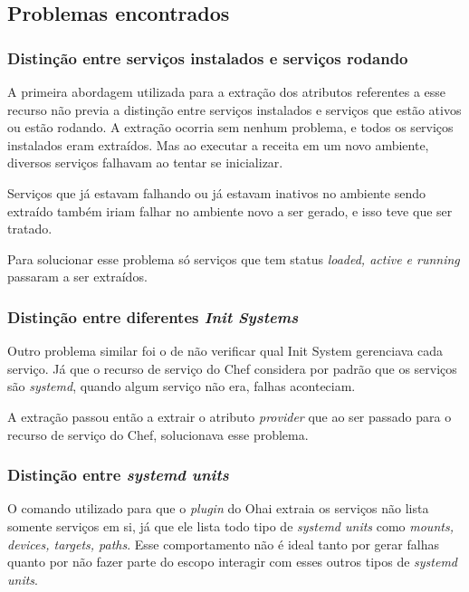 \noindent\begin{minipage}{\textwidth}
  \lstset{style=shell}
  
\end{minipage}\hfill



\subsection{Problemas encontrados}

\subsubsection{Distinção entre serviços instalados e serviços rodando}
A primeira abordagem utilizada para a extração dos atributos referentes a esse
recurso não previa a distinção entre serviços instalados e serviços que estão
ativos ou estão rodando. A extração ocorria sem nenhum problema, e todos os serviços
instalados eram extraídos. Mas ao executar a receita em um novo ambiente, diversos
serviços falhavam ao tentar se inicializar.

Serviços que já estavam falhando ou já estavam inativos no ambiente sendo extraído
também iriam falhar no ambiente novo a ser gerado, e isso teve que ser tratado.


Para solucionar esse problema só serviços que tem status \textit{loaded, active e running}
passaram a ser extraídos.\

\subsubsection{Distinção entre diferentes \textit{Init Systems}}
Outro problema similar foi o de não verificar qual Init System gerenciava cada
serviço. Já que o recurso de serviço do Chef considera por padrão que os serviços
são \textit{systemd}, quando algum serviço não era, falhas aconteciam.

A extração passou então a extrair o atributo \textit{provider} que ao ser passado
para o recurso de serviço do Chef, solucionava esse problema.

\subsubsection{Distinção entre \textit{systemd units}}
O comando utilizado para que o \textit{plugin} do Ohai extraia os serviços não
lista somente serviços em si, já que ele lista todo tipo de \textit{systemd units}
como \textit{mounts, devices, targets, paths}. Esse comportamento não é ideal
tanto por gerar falhas quanto por não fazer parte do escopo interagir com esses
outros tipos de \textit{systemd units}.

